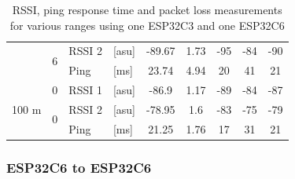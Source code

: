 \begin{table}[H]
\begin{tabular}{|c|c|l|l|c|c|c|c|c|}
        & \multirow{2}{*}{6} & RSSI 2 & [asu] & -89.67 & 1.73 & -95 & -84 & -90 \\\cline{3-9}
        && Ping & [ms] & 23.74 & 4.94 & 20 & 41 & 21 \\\hline\hline
        \multirow{3}{*}{100 m} & \multirow{1}{*}{0} & RSSI 1 & [asu] & -86.9 & 1.17 & -89 & -84 & -87 \\\cline{2-9}\cline{2-9}
        & \multirow{2}{*}{0} & RSSI 2 & [asu] & -78.95 & 1.6 & -83 & -75 & -79 \\\cline{3-9}
        && Ping & [ms] & 21.25 & 1.76 & 17 & 31 & 21 \\\hline
    \end{tabular}
    \vspace{\ftspace}
    \caption{RSSI, ping response time and packet loss measurements for various ranges using one ESP32C3 and one ESP32C6}
    \label{tab:rssipingrange_esp32c36}
\end{table}

\subsubsection{ESP32C6 to ESP32C6}

